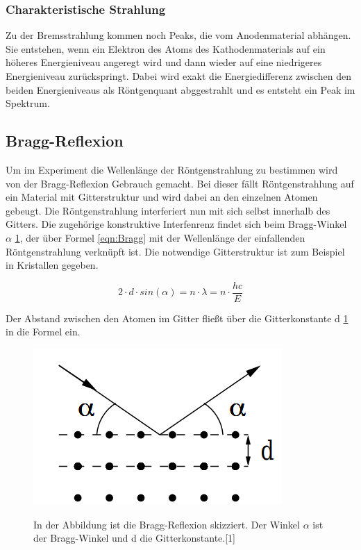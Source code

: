 \documentclass[titlepage = firstcover]{scrartcl}
\begin{document}
            \subsubsection*{Charakteristische Strahlung}
                Zu der Bremsstrahlung kommen noch Peaks, die vom Anodenmaterial abhängen. Sie entstehen, wenn ein Elektron des Atoms des Kathodenmaterials 
                auf ein höheres Energieniveau angeregt wird und dann wieder auf eine niedrigeres Energieniveau zurückspringt. Dabei wird exakt die 
                Energiedifferenz zwischen den beiden Energieniveaus als Röntgenquant abggestrahlt und es entsteht ein Peak im Spektrum.
                
        \subsection{Bragg-Reflexion}
        Um im Experiment die Wellenlänge der Röntgenstrahlung zu bestimmen wird von der Bragg-Reflexion Gebrauch gemacht. Bei dieser fällt Röntgenstrahlung
        auf ein Material mit Gitterstruktur und wird dabei an den einzelnen Atomen gebeugt. Die Röntgenstrahlung interferiert nun mit sich selbst innerhalb 
        des Gitters. Die zugehörige konstruktive Interfenrenz findet sich beim Bragg-Winkel $\alpha $ \ref{fig:SkizzeBragg}, der über Formel \ref{eqn:Bragg} 
        mit der Wellenlänge der einfallenden Röntgenstrahlung verknüpft ist. Die notwendige Gitterstruktur ist zum Beispiel in Kristallen gegeben.

        \begin{equation}
            2 \cdot d \cdot sin(\alpha) = n \cdot \lambda = n \cdot \frac{hc}{E}
            \label{eqn:Bragg}
        \end{equation}

        \noindent
        Der Abstand zwischen den Atomen im Gitter fließt über die Gitterkonstante d \ref{fig:SkizzeBragg} in die Formel ein.
        
        \FloatBarrier
        \begin{figure}[h]
            \centering
            \caption{In der Abbildung ist die Bragg-Reflexion skizziert. Der Winkel $\alpha$ ist der Bragg-Winkel und d die Gitterkonstante.[1]}
            \includegraphics{Bragg.png}
            \label{fig:SkizzeBragg}
        \end{figure}
        \FloatBarrier
\end{document}

